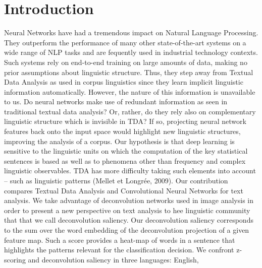 \section{Introduction}

Neural Networks have had a tremendous impact on Natural Language Processing. 
They outperform the performance of many other state-of-the-art systems on a wide range of NLP tasks 
and are fequently used in industrial technology contexts. Such systems rely on end-to-end training on large amounts of data, 
making no prior assumptions about linguistic structure. Thus, they step away from Textual Data Analysis as used in corpus linguistics since 
they learn implicit linguistic information automatically. However, the nature of this information is unavailable to us. 
Do neural networks make use of redundant information as seen in traditional textual data analysis? 
Or, rather, do they rely also on complementary linguistic structure which is invisible in TDA? If so, projecting neural network 
features back onto the input space would highlight new linguistic structures, improving the analysis of a corpus. 
Our hypothesis is that deep learning is sensitive to the linguistic units on which the computation of the 
key statistical sentences is based as well as to phenomena other than frequency and complex linguistic 
observables. TDA has more difficulty taking such elements into account -- such as linguistic patterns (Mellet et Longrée, 2009).
Our contribution compares Textual Data Analysis and Convolutional Neural Networks for text analysis. 
We take advantage of deconvolution networks used in image analysis in order to present a new perspective on text analysis to hee linguistic community that 
that we call deconvolution saliency. Our deconvolution saliency corresponds to the sum over the 
word embedding of the deconvolution projection of a given feature map. Such a score provides a heat-map of 
words in a sentence that highlights the patterns relevant for the classification decision.
We confront z-scoring and deconvolution saliency in three languages: English, 


